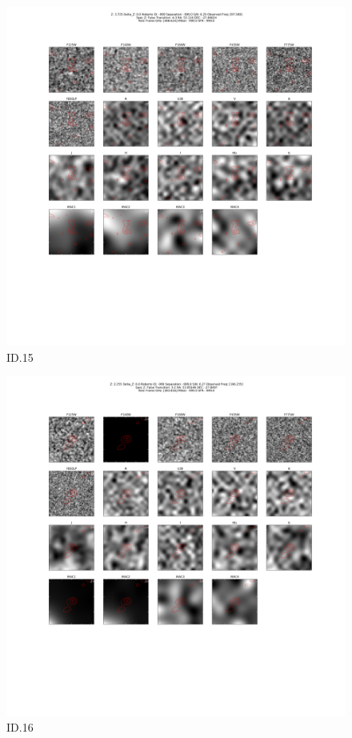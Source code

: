 \begin{figure}[tbp]
\centering \includegraphics[width=120mm]{Matched/ASPECS_Cutout_15.png}
\caption{ID.15}
\label{fig:Match_Three}
\end{figure}

\begin{figure}[tbp]
\centering \includegraphics[width=120mm]{Matched/ASPECS_Cutout_16.png}
\caption{ID.16}
\label{fig:Match_Three}
\end{figure}

